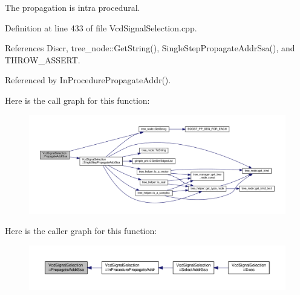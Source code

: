 The propagation is intra procedural. 

Definition at line 433 of file Vcd\+Signal\+Selection.\+cpp.



References Discr, tree\+\_\+node\+::\+Get\+String(), Single\+Step\+Propagate\+Addr\+Ssa(), and T\+H\+R\+O\+W\+\_\+\+A\+S\+S\+E\+RT.



Referenced by In\+Procedure\+Propagate\+Addr().

Here is the call graph for this function\+:
\nopagebreak
\begin{figure}[H]
\begin{center}
\leavevmode
\includegraphics[width=350pt]{dd/de4/classVcdSignalSelection_a2c6b3c717e45415bbd12fa5f82401b58_cgraph}
\end{center}
\end{figure}
Here is the caller graph for this function\+:
\nopagebreak
\begin{figure}[H]
\begin{center}
\leavevmode
\includegraphics[width=350pt]{dd/de4/classVcdSignalSelection_a2c6b3c717e45415bbd12fa5f82401b58_icgraph}
\end{center}
\end{figure}
\mbox{\label{classVcdSignalSelection_a80efeb0f8a7939933ad735730d967f24}} 
